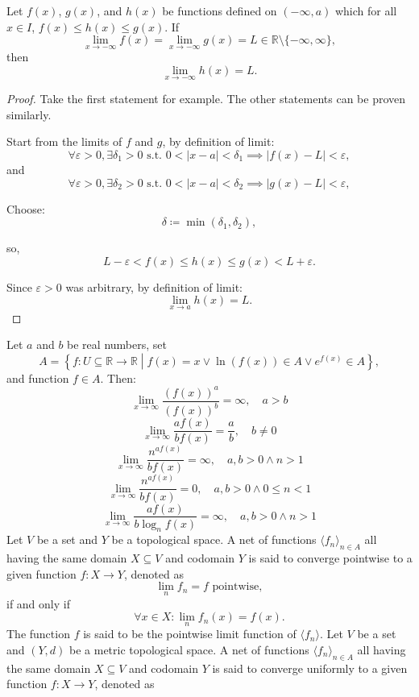 \documentclass[a4paper,12pt]{report}
\begin{document}
Let $f(x)$, $g(x)$, and $h(x)$ be functions defined on $(-\infty,a)$ which for all $x\in I$, $f(x)\leq h(x)\leq g(x)$. If
\[\lim_{x\to-\infty}f(x)=\lim_{x\to-\infty}g(x)=L\in\mathbb{R}\setminus\{-\infty,\infty\},\]
then
\[\lim_{x\to-\infty}h(x)=L.\]
\begin{proof}
Take the first statement for example. The other statements can be proven similarly.

Start from the limits of $f$ and $g$, by definition of limit:
\[\forall\varepsilon>0, \exists\delta_1>0\text{\ s.t.\ }0<|x-a|<\delta_1\implies|f(x)-L|<\varepsilon,\]
and
\[\forall\varepsilon>0, \exists\delta_2>0\text{\ s.t.\ }0<|x-a|<\delta_2\implies|g(x)-L|<\varepsilon,\]

Choose:
\[\delta\coloneq\min(\delta_1,\delta_2),\]

so,
\[L-\varepsilon<f(x)\leq h(x)\leq g(x)<L+\varepsilon.\]

Since $\varepsilon > 0$ was arbitrary, by definition of limit:
\[\lim_{x\to a}h(x)=L.\]
\end{proof}
Let \( a \) and \( b \) be real numbers, set
\[A=\left\{f\colon U\subseteq\mathbb{R}\to\mathbb{R} \middle | f(x) = x \lor \ln(f(x)) \in A \lor e^{f\left(x\right)}  \in A \right\},\]
and function $f\in A$. Then:
\[\lim_{x \to \infty} \frac{\left(f\left(x\right)\right)^a}{\left(f\left(x\right)\right)^b} = \infty, \quad a > b \]
\[ \lim_{x \to \infty} \frac{af\left(x\right)}{bf\left(x\right)} = \frac{a}{b}, \quad b \neq 0 \]
\[ \lim_{x \to \infty}\frac{n^{af\left(x\right)}}{bf\left(x\right)} = \infty, \quad a,b > 0 \land  n > 1 \]
\[ \lim_{x \to \infty}\frac{n^{af\left(x\right)}}{bf\left(x\right)} = 0, \quad a,b > 0 \land  0\leq n<1 \]
\[ \lim_{x \to \infty}\frac{af\left(x\right)}{b\log_n f\left(x\right)} = \infty, \quad a,b > 0 \land  n > 1 \]
Let $V$ be a set and $Y$ be a topological space. A net of functions $\langle f_n\rangle_{n\in A}$ all having the same domain $X\subseteq V$ and codomain $Y$ is said to converge pointwise to a given function $f\colon X\to Y$, denoted as 
\[\lim_nf_n=f\text{\ pointwise},\]
if and only if
\[\forall x\in X\colon\lim_nf_n(x)=f(x).\]
The function $f$ is said to be the pointwise limit function of $\langle f_n\rangle$.
Let $V$ be a set and $(Y,d)$ be a metric topological space. A net of functions $\langle f_n\rangle_{n\in A}$ all having the same domain $X\subseteq V$ and codomain $Y$ is said to converge uniformly to a given function $f\colon X\to Y$, denoted as 
\end{document}
